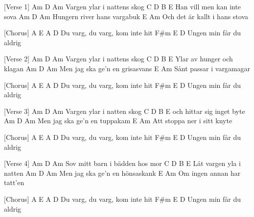 [Verse 1]
Am             D       Am
Vargen ylar i nattens skog
     C        D        B    E
Han vill men kan inte sova
 Am                 D    Am
Hungern river hans vargabuk
                          E Am
Och det är kallt i hans stova

[Chorus]
    A        E        A     D
Du varg, du varg, kom inte hit
F#m        E     D
Ungen min får du aldrig

[Verse 2]
Am             D       Am
Vargen ylar i nattens skog
C        D          B     E
Ylar av hunger och klagan
Am                    D   Am
Men jag ska ge'n en grisasvans
                    E Am
Sånt passar i vargamagar

[Chorus]
    A        E        A     D
Du varg, du varg, kom inte hit
F#m        E     D
Ungen min får du aldrig

[Verse 3]
Am             D      Am
Vargen ylar i natten skog
     C      D          B   E
och hittar sig  inget byte
Am                   D   Am
Men jag ska ge'n en tuppakam
                        E Am
Att stoppa ner i sitt knyte

[Chorus]
    A        E        A     D
Du varg, du varg, kom inte hit
F#m        E     D
Ungen min får du aldrig

[Verse 4]
Am               D         Am
Sov mitt barn i bädden hos mor
     C     D      B     E
Låt vargen yla i natten
     Am              D     Am
Men jag ska ge'n en hönsaskank
                    E   Am
Om ingen annan har tatt'en

[Chorus]
    A        E        A     D
Du varg, du varg, kom inte hit
F#m        E     D
Ungen min får du aldrig
